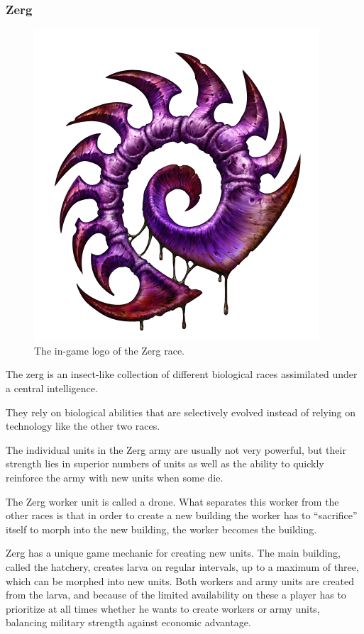 \subsubsection{Zerg}
\begin{figure}[h!tb]
\centering
\includegraphics[scale=0.2]{graphics/zergicon.png}
\caption{The in-game logo of the Zerg race.\cite{zerglogo}}
\end{figure}

The zerg is an insect-like collection of different biological races assimilated under a central intelligence.

They rely on biological abilities that are selectively evolved instead of relying on technology like the other two races.

The individual units in the Zerg army are usually not very powerful, but their strength lies in superior numbers of units as well as the ability to quickly reinforce the army with new units when some die.

The Zerg worker unit is called a drone. What separates this worker from the other races is that in order to create a new building the worker has to ``sacrifice'' itself to morph into the new building, the worker becomes the building.

Zerg has a unique game mechanic for creating new units. The main building, called the hatchery, creates larva on regular intervals, up to a maximum of three, which can be morphed into new units. Both workers and army units are created from the larva, and because of the limited availability on these a player has to prioritize at all times whether he wants to create workers or army units, balancing military strength against economic advantage.

